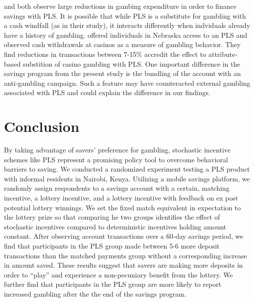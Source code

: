 \documentclass[11pt]{article}
\begin{document}
		\textcite{atalay_savings_2014} and \textcite{dizon_leveraging_2016} both observe large reductions in gambing expenditure in order to finance savings with PLS. It is possible that while PLS is a substitute for gambling with a cash windfall (as in their study), it interacts differently when indviduals already have a history of gambling. \textcite{cookson_when_2016} offered individuals in Nebraska access to an PLS and observed cash withdrawals at casinos as a measure of gambling behavior. They find reductions in transactions between 7-15\% accredit the effect to attribute-based substition of casino gambling with PLS. One important difference in the savings program from the present study is the bundling of the account with an anti-gambling campaign. Such a feature may have counteracted external gambling associated with PLS and could explain the difference in our findings.

		

\section{Conclusion} \label{sec:conclusion}


		By taking advantage of savers' preference for gambling, stochastic incentive schemes like PLS represent a promising policy tool to overcome behavioral barriers to saving. We conducted a randomized experiment testing a PLS product with informal residents in Nairobi, Kenya. Utilizing a mobile savings platform, we randomly assign respondents to a savings account with a certain, matching incentive, a lottery incentive, and a lottery incentive with feedback on ex post potential lottery winnings. We set the fixed match equivalent in expectation to the lottery prize so that comparing he two groups identifies the effect of stochastic incentives compared to deterministic incentives holding amount constant. After observing account transactions over a 60-day savings period, we find that participants in the PLS group made between 5-6 more deposit transactions than the matched payments group without a corresponding increase in amount saved. These results suggest that savers are making more deposits in order to ``play'' and experience a non-pecuniary benefit from the lottery. We further find that participants in the PLS group are more likely to report increased gambling after the the end of the savings program.
\end{document}
